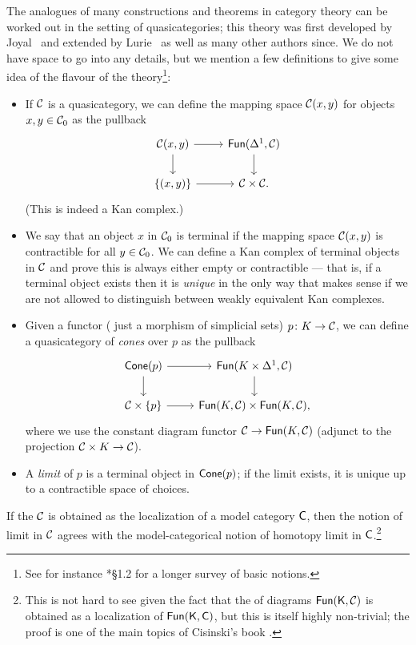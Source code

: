 \documentclass[a4paper,11pt]{article}
\begin{document}
The \icatl{} analogues of many
constructions and theorems in category theory can be worked
out in the setting of quasicategories; this theory was first developed
by Joyal~\cite{JoyalUABNotes} and extended by Lurie~\cite{HTT} as well
as many other authors since. We do not have space to go into any
details, but we mention a few definitions to give some idea of
the flavour of the theory\footnote{See for instance \cite{HTT}*{\S 1.2} for a
longer survey of basic notions.}:
\begin{itemize}
\item If $\mathcal{C}$ is a quasicategory, we can define the mapping space
  $\mathcal{C}(x,y)$ for objects $x,y \in \mathcal{C}_{0}$ as the pullback
  \[
    \begin{tikzcd}
      \eC(x,y) \arrow{r} \arrow{d} & \Fun(\Delta^{1}, \eC) \arrow{d}
      \\
      \{(x,y)\} \arrow{r} & \eC \times \eC.
    \end{tikzcd}
  \]
  (This is indeed a Kan complex.)
\item We say that an object $x$ in $\mathcal{C}_{0}$ is terminal if the
  mapping space $\mathcal{C}(x,y)$ is contractible for all $y \in \mathcal{C}_{0}$. We
  can define a Kan complex of terminal objects in $\mathcal{C}$ and prove this
  is always either empty or contractible --- that is, if a terminal
  object exists then it is \emph{unique} in the only way that makes
  sense if we are not allowed to distinguish between weakly
  equivalent Kan complexes.
\item Given a functor (\ie{} just a morphism of simplicial sets) $p
  \colon K \to \eC$, we can define a quasicategory of \emph{cones}
  over $p$ as the pullback
  \[
    \begin{tikzcd}
      \catname{Cone}(p) \arrow{r} \arrow{d} & \Fun(K \times \Delta^{1}, \eC) \arrow{d}
      \\
      \eC \times \{p\} \arrow{r} & \Fun(K, \eC) \times \Fun(K, \eC),
    \end{tikzcd}
  \]
  where we use the constant diagram functor $\eC \to \Fun(K, \eC)$
  (adjunct to the projection $\eC \times K \to \eC$).
\item A \emph{limit} of $p$ is a terminal object in
  $\textup{\textsf{Cone}}(p)$; if the limit exists, it is unique up to a
  contractible space of choices.  
\end{itemize}

\begin{remark}
  If the \icat{} $\mathcal{C}$ is obtained as the localization of a model
  category $\textup{\textsf{C}}$, then the \icatl{} notion of limit in $\mathcal{C}$ agrees
  with the model-categorical notion of homotopy limit in
  $\textup{\textsf{C}}$.\footnote{This is not hard to see given the fact that the
    \icat{} of diagrams $\textup{\textsf{Fun}}(\textup{\textsf{K}}, \mathcal{C})$ is obtained as a localization
  of $\textup{\textsf{Fun}}(\textup{\textsf{K}}, \textup{\textsf{C}})$, but this is itself highly non-trivial; the proof is
  one of the main topics of Cisinski's book \cite{CisinskiBook}.}
\end{remark}
\end{document}
